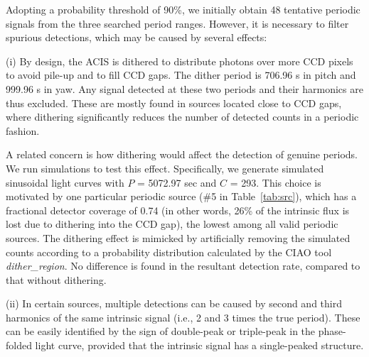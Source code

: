 \documentclass[fleqn,usenatbib]{mnras}
\begin{document}
Adopting a probability threshold of 90\%, we initially obtain 48 tentative periodic signals from the three searched period ranges. However, it is necessary to filter spurious detections, which may be caused by several effects:

(i) By design, the ACIS is dithered to distribute photons over more CCD pixels to avoid pile-up and to fill CCD gaps. The dither period is 706.96 s in pitch and 999.96 s in yaw. Any signal detected at these two periods and their harmonics are thus excluded. These are mostly found in sources located close to CCD gaps, where dithering significantly reduces the number of detected counts in a periodic fashion. 

A related concern is how dithering would affect the detection of genuine periods.  
We run simulations to test this effect. Specifically, we generate simulated sinusoidal light curves with $P$ = 5072.97 sec and $C$ = 293. 
This choice is motivated by one particular periodic source (\#5 in Table~\ref{tab:src}), which has a fractional detector coverage of 0.74 (in other words, 26\% of the intrinsic flux is lost due to dithering into the CCD gap), the lowest among all valid periodic sources. The dithering effect is mimicked by artificially removing the simulated counts according to a probability distribution calculated by the CIAO tool \emph{dither\_region}. 
No difference is found in the resultant detection rate, compared to that without dithering. 

(ii) In certain sources, multiple detections can be caused by second and third harmonics of the same intrinsic signal (i.e., 2 and 3 times the true period). These can be easily identified by the sign of double-peak or triple-peak in the phase-folded light curve, provided that the intrinsic signal has a single-peaked structure. 
\end{document}
